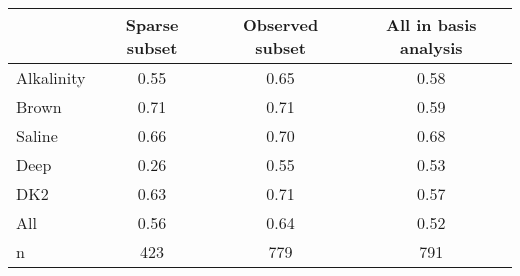 \begin{tabular}{lccc}
\toprule
 & Sparse subset & Observed subset & All in basis analysis \\
\midrule
Alkalinity & 0.55 & 0.65 & 0.58 \\
Brown & 0.71 & 0.71 & 0.59 \\
Saline & 0.66 & 0.70 & 0.68 \\
Deep & 0.26 & 0.55 & 0.53 \\
DK2 & 0.63 & 0.71 & 0.57 \\
All & 0.56 & 0.64 & 0.52 \\
n & 423 & 779 & 791 \\
\bottomrule
\end{tabular}
